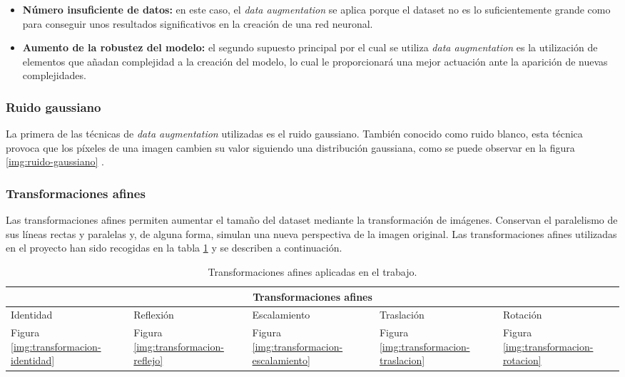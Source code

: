 \begin{itemize}
	\item \textbf{Número insuficiente de datos:} en este caso, el \textit{data augmentation} se aplica porque el dataset no es lo suficientemente grande como para conseguir unos resultados 
significativos en la creación de una red neuronal.
	\item \textbf{Aumento de la robustez del modelo:} el segundo supuesto principal por el cual se utiliza \textit{data augmentation} es la utilización de elementos que añadan complejidad a la
creación del modelo, lo cual le proporcionará una mejor actuación ante la aparición de nuevas complejidades.
\end{itemize}

\subsubsection{Ruido gaussiano}

La primera de las técnicas de \textit{data augmentation} utilizadas es el ruido gaussiano. 
También conocido como ruido blanco, esta técnica provoca que los píxeles de una imagen cambien su valor siguiendo una distribución gaussiana, como se puede observar en la figura \ref{img:ruido-gaussiano} .


\subsubsection{Transformaciones afines} \label{transformacionesafines}

Las transformaciones afines permiten aumentar el tamaño del dataset mediante la transformación de imágenes. Conservan el paralelismo de sus líneas rectas y paralelas y, de alguna forma, simulan una nueva perspectiva de la imagen original.
Las transformaciones afines utilizadas en el proyecto han sido recogidas en la tabla \ref{tabla:transformaciones-afines} y se describen a continuación.

\begin{table}[h!]
\begin{tabular}{ |p{2cm}|p{1.8cm}|p{2.2cm} |p{2cm}|p{2cm}|}
	\hline
	\multicolumn{5}{|c|}{Transformaciones afines}\\ 
	\hline
	Identidad & Reflexión &Escalamiento & Traslación  & Rotación\\
	\hline
	Figura \ref{img:transformacion-identidad} & Figura \ref{img:transformacion-reflejo}     & Figura \ref{img:transformacion-escalamiento} &   Figura \ref{img:transformacion-traslacion} &   Figura \ref{img:transformacion-rotacion}\\
	\hline
\end{tabular}
\caption{\label{tabla:transformaciones-afines}Transformaciones afines aplicadas en el trabajo.}
\end{table}


